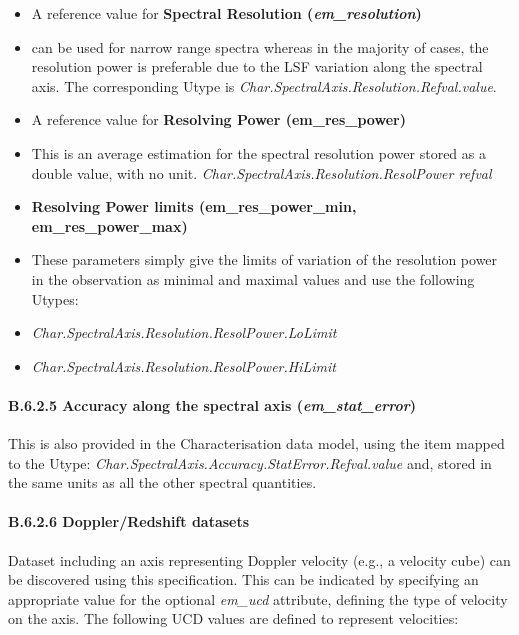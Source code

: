 \documentclass[11pt,a4paper]{ivoa}
\begin{document}
\begin{itemize}
\item[a)] A reference value for \textbf{Spectral Resolution (\emph{em\_resolution})}

\item[ ] can be used for narrow range spectra whereas in the majority of cases, the resolution power is preferable due to the
LSF variation along the spectral axis. The corresponding Utype is \emph{Char.SpectralAxis.Resolution.Refval.value}.

\item[b)] A reference value for \textbf{Resolving Power (em\_res\_power)}

\item[ ] This is an average estimation for the spectral resolution power stored as a double value, with no
unit. \emph{Char.SpectralAxis.Resolution.ResolPower refval}

\item[c)] \textbf{Resolving Power limits (em\_res\_power\_min, em\_res\_power\_max)}

\item[ ] These parameters simply give the limits of variation of the resolution power in the observation as minimal and maximal
values and use the following Utypes:

\item[ ] \emph{Char.SpectralAxis.Resolution.ResolPower.LoLimit}

\item[ ] \emph{Char.SpectralAxis.Resolution.ResolPower.HiLimit}
\end{itemize}

\paragraph{B.6.2.5 Accuracy along the spectral axis (\emph{em\_stat\_error})}
This is also provided in the Characterisation data model, using the item mapped to the Utype:
\emph{Char.SpectralAxis.Accuracy.StatError.Refval.value} and, stored in the same units as all the other spectral quantities.

\paragraph{B.6.2.6 Doppler/Redshift datasets}
Dataset including an axis representing Doppler velocity (e.g., a velocity cube) can be discovered using this
specification. This can be indicated by specifying an appropriate value for the optional \emph{em\_ucd} attribute, defining
the type of velocity on the axis. The following UCD values are defined to represent velocities:
\end{document}
